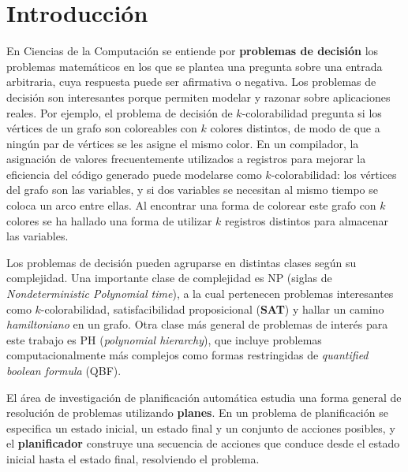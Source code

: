 
\chapter*{Introducción} %
\label{Intro}
En Ciencias de la Computación se entiende por \textbf{problemas de decisión}
los problemas matemáticos en los que se plantea una pregunta sobre una entrada
arbitraria, cuya respuesta puede ser afirmativa o negativa.
Los problemas de decisión son interesantes porque permiten modelar y razonar
sobre aplicaciones reales. Por ejemplo, el problema de decisión de
$k$-colorabilidad pregunta si los vértices de un grafo son coloreables 
con $k$ colores distintos, de modo de que a ningún par de vértices se les
asigne el mismo color. En un compilador, la asignación de valores
frecuentemente utilizados a registros para
mejorar la eficiencia del código generado puede modelarse como
$k$-colorabilidad: los vértices del grafo son las variables, y si dos variables
se necesitan al mismo tiempo se coloca un arco entre ellas. Al encontrar una
forma de colorear este grafo con $k$ colores se ha hallado una forma de
utilizar $k$ registros distintos para almacenar las variables.

Los problemas de decisión pueden agruparse en distintas clases según su
complejidad. Una importante clase de complejidad es NP (siglas de
\textit{Nondeterministic Polynomial time}), a la cual pertenecen problemas
interesantes como $k$-colorabilidad, satisfacibilidad proposicional
(\textbf{SAT}) y hallar un camino \textit{hamiltoniano} en un grafo. Otra clase
más general de problemas de interés para este trabajo es PH (\textit{polynomial hierarchy}),
que incluye problemas computacionalmente más complejos como formas restringidas de
\textit{quantified boolean formula} (QBF).

El área de investigación de planificación automática estudia una forma general
de resolución de problemas utilizando \textbf{planes}. En un problema de planificación
se especifica un estado inicial, un estado final y un conjunto de acciones posibles,
y el \textbf{planificador} construye una secuencia de acciones que conduce
desde el estado inicial hasta el estado final, resolviendo el problema.


